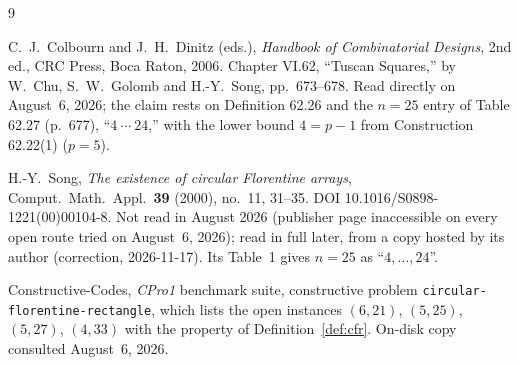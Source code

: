 \documentclass[11pt]{amsart}
\theoremstyle{plain}
\theoremstyle{definition}
\theoremstyle{remark}
\begin{document}
\begin{thebibliography}{9}

C.~J.~Colbourn and J.~H.~Dinitz (eds.),
\emph{Handbook of Combinatorial Designs}, 2nd ed.,
CRC Press, Boca Raton, 2006. Chapter VI.62, ``Tuscan Squares,'' by
W.~Chu, S.~W.~Golomb and H.-Y.~Song, pp.~673--678. Read directly on
August~6, 2026; the claim rests on Definition 62.26 and the $n=25$ entry of
Table 62.27 (p.~677), ``$4\ \cdots\ 24$,'' with the lower bound $4=p-1$ from
Construction 62.22(1) ($p=5$).

H.-Y.~Song,
\emph{The existence of circular Florentine arrays},
Comput.\ Math.\ Appl.\ \textbf{39} (2000), no.~11, 31--35.
DOI 10.1016/S0898-1221(00)00104-8. Not read in August 2026 (publisher page
inaccessible on every open route tried on August~6, 2026); read in full later,
from a copy hosted by its author (correction, 2026-11-17). Its Table~1 gives
$n=25$ as ``$4,\dots,24$''.

Constructive-Codes, \emph{CPro1} benchmark suite,
constructive problem \texttt{circular-florentine-rectangle}, which lists the
open instances $(6,21)$, $(5,25)$, $(5,27)$, $(4,33)$ with the property of
Definition~\ref{def:cfr}. On-disk copy consulted August~6, 2026.

\end{thebibliography}
\end{document}
